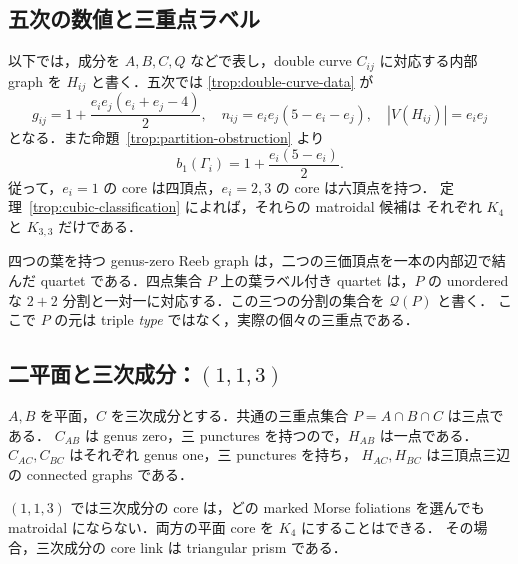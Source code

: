 \subsection{五次の数値と三重点ラベル}

以下では，成分を $A,B,C,Q$ などで表し，double curve $C_{ij}$ に対応する内部 graph を
$H_{ij}$ と書く．五次では \eqref{trop:double-curve-data} が
\begin{equation}\label{q5:curve-data}
 g_{ij}=1+\frac{e_i e_j(e_i+e_j-4)}2,
 \quad n_{ij}=e_i e_j(5-e_i-e_j),
 \quad |V(H_{ij})|=e_i e_j
\end{equation}
となる．また命題~\ref{trop:partition-obstruction} より
\begin{equation}\label{q5:core-genus}
 b_1(\Gamma_i)=1+\frac{e_i(5-e_i)}2.
\end{equation}
従って，$e_i=1$ の core は四頂点，$e_i=2,3$ の core は六頂点を持つ．
定理~\ref{trop:cubic-classification} によれば，それらの matroidal 候補は
それぞれ $K_4$ と $K_{3,3}$ だけである．

四つの葉を持つ genus-zero Reeb graph は，二つの三価頂点を一本の内部辺で結んだ
quartet である．四点集合 $P$ 上の葉ラベル付き quartet は，$P$ の unordered な
$2+2$ 分割と一対一に対応する．この三つの分割の集合を $\mathcal Q(P)$ と書く．
ここで $P$ の元は triple \emph{type} ではなく，実際の個々の三重点である．

\subsection{二平面と三次成分：\texorpdfstring{$(1,1,3)$}{(1,1,3)}}

$A,B$ を平面，$C$ を三次成分とする．共通の三重点集合 $P=A\cap B\cap C$ は三点である．
$C_{AB}$ は genus zero，三 punctures を持つので，$H_{AB}$ は一点である．
$C_{AC},C_{BC}$ はそれぞれ genus one，三 punctures を持ち，
$H_{AC},H_{BC}$ は三頂点三辺の connected graphs である．

\begin{proposition}\label{q5:113}
$(1,1,3)$ では三次成分の core は，どの marked Morse foliations を選んでも
matroidal にならない．両方の平面 core を $K_4$ にすることはできる．
その場合，三次成分の core link は triangular prism である．
\end{proposition}


